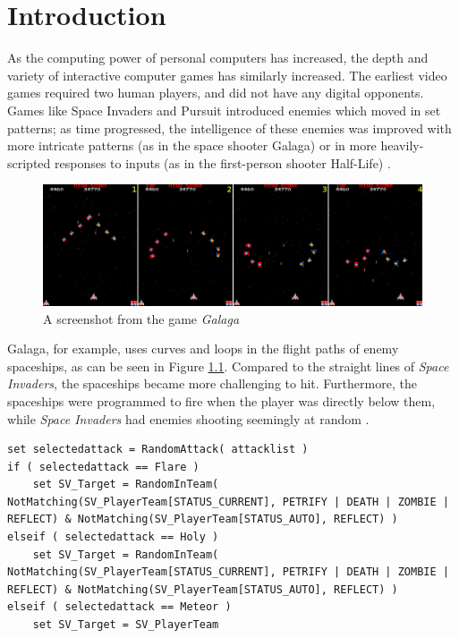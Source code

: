 \chapter{Introduction}
As the computing power of personal computers has increased, the depth and variety of interactive computer games has similarly increased. The earliest video games required two human players, and did not have any digital opponents. Games like Space Invaders and Pursuit introduced enemies which moved in set patterns; as time progressed, the intelligence of these enemies was improved with more intricate patterns (as in the space shooter Galaga) or in more heavily-scripted responses to inputs (as in the first-person shooter Half-Life) \cite{schw04}.

\begin{figure}[H]
  \centering
  \includegraphics{figures/ExampleGalaga.png}
  \caption{A screenshot from the game \textit{Galaga}}
  \label{fig:Galaga}
\end{figure}
Galaga, for example, uses curves and loops in the flight paths of enemy spaceships, as can be seen in Figure \ref{fig:Galaga}. Compared to the straight lines of \textit{Space Invaders}, the spaceships became more challenging to hit. Furthermore, the spaceships were programmed to fire when the player was directly below them, while \textit {Space Invaders} had enemies shooting seemingly at random \cite{schw04}.\\

\begin{lstlisting}
set selectedattack = RandomAttack( attacklist )
if ( selectedattack == Flare )
    set SV_Target = RandomInTeam( NotMatching(SV_PlayerTeam[STATUS_CURRENT], PETRIFY | DEATH | ZOMBIE | REFLECT) & NotMatching(SV_PlayerTeam[STATUS_AUTO], REFLECT) )
elseif ( selectedattack == Holy )
    set SV_Target = RandomInTeam( NotMatching(SV_PlayerTeam[STATUS_CURRENT], PETRIFY | DEATH | ZOMBIE | REFLECT) & NotMatching(SV_PlayerTeam[STATUS_AUTO], REFLECT) )
elseif ( selectedattack == Meteor )
    set SV_Target = SV_PlayerTeam
\end{lstlisting}


